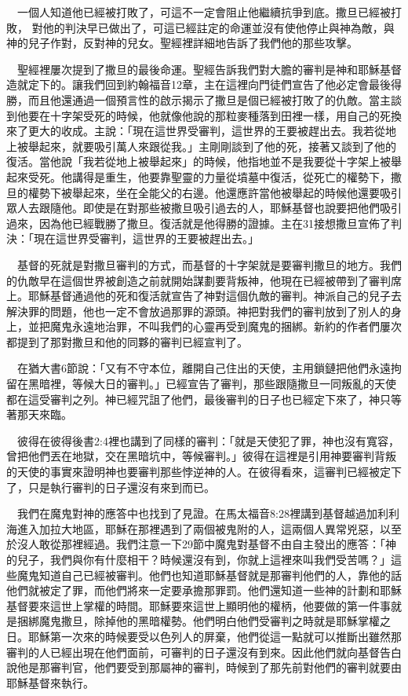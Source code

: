 \documentclass{book}
\begin{document}
　一個人知道他已經被打敗了，可這不一定會阻止他繼續抗爭到底。撒旦已經被打敗， 對他的判決早已做出了，可這已經註定的命運並沒有使他停止與神為敵，與神的兒子作對，反對神的兒女。聖經裡詳細地告訴了我們他的那些攻擊。

　聖經裡屢次提到了撒旦的最後命運。聖經告訴我們對大膽的審判是神和耶穌基督造就定下的。讓我們回到約翰福音12章，主在這裡向門徒們宣告了他必定會最後得勝，而且他還通過一個預言性的啟示揭示了撒旦是個已經被打敗了的仇敵。當主談到他要在十字架受死的時候，他就像他說的那粒麥種落到田裡一樣，用自己的死換來了更大的收成。主說：「現在這世界受審判，這世界的王要被趕出去。我若從地上被舉起來，就要吸引萬人來跟從我。」主剛剛談到了他的死，接著又談到了他的復活。當他說「我若從地上被舉起來」的時候，他指地並不是我要從十字架上被舉起來受死。他講得是重生，他要靠聖靈的力量從墳墓中復活，從死亡的權勢下，撒旦的權勢下被舉起來，坐在全能父的右邊。他還應許當他被舉起的時候他還要吸引眾人去跟隨他。即使是在對那些被撒旦吸引過去的人，耶穌基督也說要把他們吸引過來，因為他已經戰勝了撒旦。復活就是他得勝的證據。主在31接想撒旦宣佈了判決：「現在這世界受審判，這世界的王要被趕出去。」

　基督的死就是對撒旦審判的方式，而基督的十字架就是要審判撒旦的地方。我們的仇敵早在這個世界被創造之前就開始謀劃要背叛神，他現在已經被帶到了審判席上。耶穌基督通過他的死和復活就宣告了神對這個仇敵的審判。神派自己的兒子去解決罪的問題，他也一定不會放過那罪的源頭。神把對我們的審判放到了別人的身上，並把魔鬼永遠地治罪，不叫我們的心靈再受到魔鬼的捆綁。新約的作者們屢次都提到了那對撒旦和他的同夥的審判已經宣判了。

　在猶大書6節說：「又有不守本位，離開自己住出的天使，主用鎖鏈把他們永遠拘留在黑暗裡，等候大日的審判。」已經宣告了審判，那些跟隨撒旦一同叛亂的天使都在這受審判之列。神已經咒詛了他們，最後審判的日子也已經定下來了，神只等著那天來臨。

　彼得在彼得後書2:4裡也講到了同樣的審判：「就是天使犯了罪，神也沒有寬容，曾把他們丟在地獄，交在黑暗坑中，等候審判。」彼得在這裡是引用神要審判背叛的天使的事實來證明神也要審判那些悖逆神的人。在彼得看來，這審判已經被定下了，只是執行審判的日子還沒有來到而已。

　我們在魔鬼對神的應答中也找到了見證。在馬太福音8:28裡講到基督越過加利利海進入加拉大地區，耶穌在那裡遇到了兩個被鬼附的人，這兩個人異常兇惡，以至於沒人敢從那裡經過。我們注意一下29節中魔鬼對基督不由自主發出的應答：「神的兒子，我們與你有什麼相干？時候還沒有到，你就上這裡來叫我們受苦嗎？」這些魔鬼知道自己已經被審判。他們也知道耶穌基督就是那審判他們的人，靠他的話他們就被定了罪，而他們將來一定要承擔那罪罰。他們還知道一些神的計劃和耶穌基督要來這世上掌權的時間。耶穌要來這世上顯明他的權柄，他要做的第一件事就是捆綁魔鬼撒旦，除掉他的黑暗權勢。他們明白他們受審判之時就是耶穌掌權之日。耶穌第一次來的時候要受以色列人的屏棄，他們從這一點就可以推斷出雖然那審判的人已經出現在他們面前，可審判的日子還沒有到來。因此他們就向基督告白說他是那審判官，他們要受到那屬神的審判，時候到了那先前對他們的審判就要由耶穌基督來執行。
\end{document}
